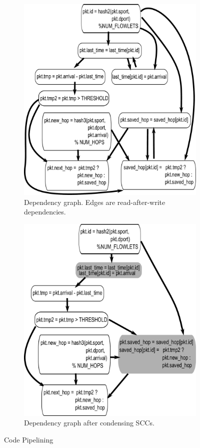 \begin{figure}[!t]
\begin{subfigure}{0.5\textwidth}
  \includegraphics[width=0.8\columnwidth]{deps.pdf}
  \caption{Dependency graph. Edges are read-after-write dependencies.}
  \label{fig:partitioning_before}
\end{subfigure}
\begin{subfigure}{0.5\textwidth}
\includegraphics[width=0.8\columnwidth]{scc.pdf}
\caption{Dependency graph after condensing SCCs.}
\label{fig:partitioning_after}
\end{subfigure}
\caption{Code Pipelining}
\label{fig:pipelining}
\end{figure}

